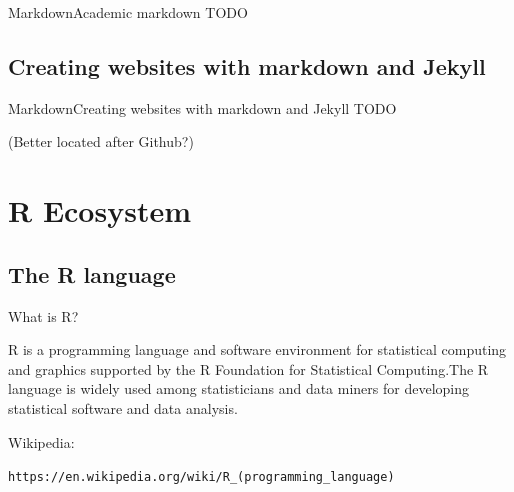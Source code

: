 \documentclass{beamer}
\begin{document}


\begin{frame}{Markdown}{Academic markdown}
	TODO
\end{frame}


\subsection{Creating websites with markdown and Jekyll}



\begin{frame}{Markdown}{Creating websites with markdown and Jekyll}
	TODO

	(Better located after Github?)
\end{frame}





\section{R Ecosystem}


\subsection[R language]{The R language}


\begin{frame}{What is R?} %

R is a programming language and software environment for statistical computing and graphics supported by the R Foundation for Statistical Computing.The R language is widely used among statisticians and data miners for developing statistical software and data analysis.

Wikipedia: 

\begin{footnotesize}
\texttt{https://en.wikipedia.org/wiki/R\_(programming\_language)}                                                                 \end{footnotesize}


\end{frame}
\end{document}

